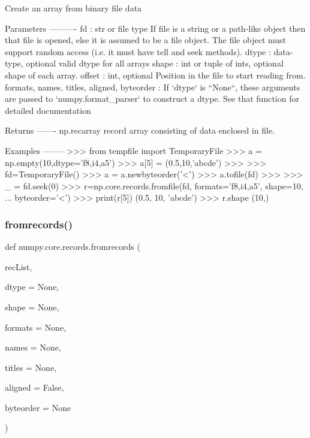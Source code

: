 \begin{DoxyVerb}Create an array from binary file data

Parameters
----------
fd : str or file type
    If file is a string or a path-like object then that file is opened,
    else it is assumed to be a file object. The file object must
    support random access (i.e. it must have tell and seek methods).
dtype : data-type, optional
    valid dtype for all arrays
shape : int or tuple of ints, optional
    shape of each array.
offset : int, optional
    Position in the file to start reading from.
formats, names, titles, aligned, byteorder :
    If `dtype` is ``None``, these arguments are passed to
    `numpy.format_parser` to construct a dtype. See that function for
    detailed documentation

Returns
-------
np.recarray
    record array consisting of data enclosed in file.

Examples
--------
>>> from tempfile import TemporaryFile
>>> a = np.empty(10,dtype='f8,i4,a5')
>>> a[5] = (0.5,10,'abcde')
>>>
>>> fd=TemporaryFile()
>>> a = a.newbyteorder('<')
>>> a.tofile(fd)
>>>
>>> _ = fd.seek(0)
>>> r=np.core.records.fromfile(fd, formats='f8,i4,a5', shape=10,
... byteorder='<')
>>> print(r[5])
(0.5, 10, 'abcde')
>>> r.shape
(10,)
\end{DoxyVerb}
 \mbox{\label{namespacenumpy_1_1core_1_1records_a79c421917f1afc5684031b61d544ce0b}} 
\subsubsection{\texorpdfstring{fromrecords()}{fromrecords()}}
{\footnotesize\ttfamily def numpy.\+core.\+records.\+fromrecords (\begin{DoxyParamCaption}\item[{}]{rec\+List,  }\item[{}]{dtype = {\ttfamily None},  }\item[{}]{shape = {\ttfamily None},  }\item[{}]{formats = {\ttfamily None},  }\item[{}]{names = {\ttfamily None},  }\item[{}]{titles = {\ttfamily None},  }\item[{}]{aligned = {\ttfamily False},  }\item[{}]{byteorder = {\ttfamily None} }\end{DoxyParamCaption})}

